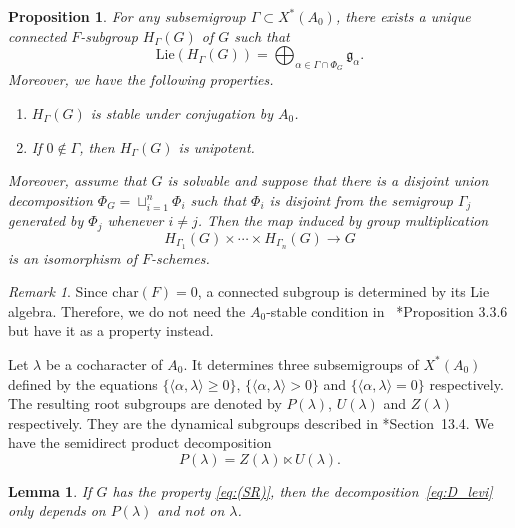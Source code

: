 \documentclass[letterpaper,11pt]{amsart}
\newcommand{\fg}{\mathfrak{g}}
\newcommand{\<}{\negthickspace}
\theoremstyle{definition}
\theoremstyle{plain}
\newtheorem{prop}[definition]{Proposition}
\newtheorem{lemma}[definition]{Lemma}
\theoremstyle{remark}
\newtheorem{remark}[definition]{Remark}
\numberwithin{equation}{section}
\begin{document}
\begin{prop} \label{prop:root subgroup}
For any subsemigroup $\Gamma \subset X^*(A_0)$, there exists a unique connected
$F$-subgroup $H_\Gamma(G)$ of $G$ such that
    \[
    \mathrm{Lie}(H_\Gamma(G)) =
    \bigoplus_{\alpha \in \Gamma \cap \Phi_G} \fg_\alpha.
    \]
Moreover, we have the following properties.
    \begin{enumerate}
        \item $H_\Gamma(G)$ is stable under conjugation by $A_0$.

        \item If $0 \not \in \Gamma$, then $H_\Gamma(G)$ is unipotent.
            \end{enumerate}

        Moreover, assume that $G$ is solvable and suppose that there is a disjoint union decomposition $\Phi_G=\sqcup_{i=1}^n \Phi_i$ such that $\Phi_i$ is disjoint from the semigroup $\Gamma_j$ generated by $\Phi_j$ whenever $i \neq j$. Then the map induced by group
            multiplication
            \[
             H_{\Gamma_1}(G) \times \cdots \times H_{\Gamma_n}(G) \to G
            \]
        is an isomorphism of $F$-schemes.
\end{prop}

\begin{remark}
Since $\mathrm{char}(F)=0$, a connected subgroup is determined by its Lie
algebra. Therefore, we do not need the $A_0$-stable condition in ~\cite{CGP}*{Proposition 3.3.6} but
have it as a property instead.
\end{remark}

Let $\lambda$ be a cocharacter of $A_0$. It determines three subsemigroups of
$X^*(A_0)$ defined by the equations $\{ \langle \alpha ,\lambda\rangle \ge 0\}$,
$\{ \langle  \alpha ,\lambda \rangle > 0\}$ and $\{  \langle  \alpha ,
\lambda \rangle = 0\}$ respectively. The resulting root subgroups are denoted
by $P(\lambda)$, $U(\lambda)$ and $Z(\lambda)$ respectively. They are the
dynamical subgroups described in \cite{Springer}*{Section~13.4}. We have
the semidirect product decomposition
    \begin{equation}    \label{eq:D_levi}
    P(\lambda) = Z(\lambda) \ltimes U(\lambda).
    \end{equation}

\begin{lemma} \label{lem:unique Levi decomposition}
If $G$ has the property \eqref{eq:(SR)}, then the
decomposition~\eqref{eq:D_levi} only depends on $P(\lambda)$ and not on
$\lambda$.
\end{lemma}
\end{document}
